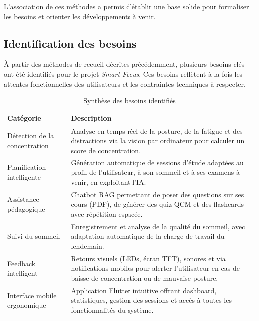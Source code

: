 \documentclass[12pt,a4paper]{report}
\begin{document}
L'association de ces méthodes a permis d'établir une base solide pour formaliser les besoins et orienter les développements à venir.

\subsection{Identification des besoins}

À partir des méthodes de recueil décrites précédemment, plusieurs besoins clés ont été identifiés pour le projet \textit{Smart Focus}. Ces besoins reflètent à la fois les attentes fonctionnelles des utilisateurs et les contraintes techniques à respecter.

\vspace{0.5em}
\begin{table}[H]
    \centering
    \caption{Synthèse des besoins identifiés}
    \label{tab:besoins_identifies}
    \begin{tabular}{|p{5.5cm}|p{8.5cm}|}
        \hline
        \textbf{Catégorie} & \textbf{Description} \\ \hline
        Détection de la concentration & Analyse en temps réel de la posture, de la fatigue et des distractions via la vision par ordinateur pour calculer un score de concentration. \\ \hline
        Planification intelligente & Génération automatique de sessions d'étude adaptées au profil de l'utilisateur, à son sommeil et à ses examens à venir, en exploitant l'\ac{IA}. \\ \hline
        Assistance pédagogique & Chatbot \ac{RAG} permettant de poser des questions sur ses cours (PDF), de générer des quiz QCM et des flashcards avec répétition espacée. \\ \hline
        Suivi du sommeil & Enregistrement et analyse de la qualité du sommeil, avec adaptation automatique de la charge de travail du lendemain. \\ \hline
        Feedback intelligent & Retours visuels (LEDs, écran TFT), sonores et via notifications mobiles pour alerter l'utilisateur en cas de baisse de concentration ou de mauvaise posture. \\ \hline
        Interface mobile ergonomique & Application Flutter intuitive offrant dashboard, statistiques, gestion des sessions et accès à toutes les fonctionnalités du système. \\ \hline
    \end{tabular}
\end{table}
\end{document}
